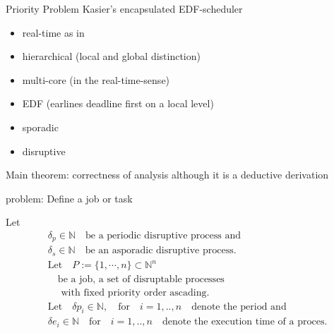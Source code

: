 \documentclass{beamer}
\begin{document}
 	
 	\begin{frame}{Priority Problem}
		Kasier's  encapsulated EDF-scheduler \cite{K}
		\begin{itemize}
			\item real-time as in \cite{KBK}
			\item hierarchical (local and global distinction)
			\item multi-core (in the real-time-sense)
			\item EDF (earlines deadline first on a local level)
			\item sporadic 
			\item disruptive
		\end{itemize}	
		Main theorem: correctness of analysis although it is a deductive derivation				
 	\end{frame}


 	
 	\begin{frame}{problem: Define a job or  task}
 	\begin{definition}
Let      
\begin{align*} & \delta_p \in \mathbb{N} \quad \text{be a periodic disruptive process and}\\
 	&\delta_s \in  \mathbb{N} \quad \text{be an asporadic disruptive process.}\\
	 &\text{Let} \quad P := \{1, \cdots, n \} \subset \mathbb{N}^n \\
	 &\quad \text{be a job, a set of disruptable processes}\\
	 &\quad \text{ with fixed priority order ascading.} \\
 	&\text{Let} \quad  \delta p_i \in \mathbb{N}, \quad \text{for} \quad i = 1,..,n \quad  \text{denote the period and}  \\
 	&\delta e_i \in \mathbb{N} \quad \text{for} \quad  i = 1,..,n \quad  \text{denote the execution time of a proces}.  
\end{align*}   
\end{definition}
 	\end{frame}
 	
\end{document}
